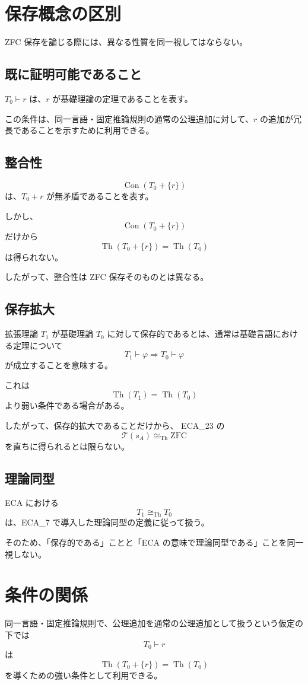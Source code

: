 \documentclass[a4paper,11pt]{article}
\begin{document}
\section{保存概念の区別}
ZFC 保存を論じる際には、異なる性質を同一視してはならない。

\subsection{既に証明可能であること}
$T_0\vdash r$ は、$r$ が基礎理論の定理であることを表す。

この条件は、同一言語・固定推論規則の通常の公理追加に対して、$r$ の追加が冗長であることを示すために利用できる。

\subsection{整合性}

\[
\operatorname{Con}(T_0+\{r\})
\]
は、$T_0+r$ が無矛盾であることを表す。

しかし、
\[
\operatorname{Con}(T_0+\{r\})
\]
だけから
\[
\operatorname{Th}(T_0+\{r\})
=
\operatorname{Th}(T_0)
\]
は得られない。

したがって、整合性は ZFC 保存そのものとは異なる。

\subsection{保存拡大}
拡張理論 $T_1$ が基礎理論 $T_0$ に対して保存的であるとは、通常は基礎言語における定理について
\[
T_1\vdash\varphi
\Longrightarrow
T_0\vdash\varphi
\]
が成立することを意味する。

これは
\[
\operatorname{Th}(T_1)=\operatorname{Th}(T_0)
\]
より弱い条件である場合がある。

したがって、保存的拡大であることだけから、
ECA_23 の
\[
\mathcal{T}(s_A)\cong_{\mathrm{Th}}\mathrm{ZFC}
\]
を直ちに得られるとは限らない。

\subsection{理論同型}
ECA における
\[
T_1\cong_{\mathrm{Th}}T_0
\]
は、ECA_7 で導入した理論同型の定義に従って扱う。

そのため、「保存的である」ことと「ECA の意味で理論同型である」ことを同一視しない。

\section{条件の関係}
同一言語・固定推論規則で、公理追加を通常の公理追加として扱うという仮定の下では
\[
T_0\vdash r
\]
は
\[
\operatorname{Th}(T_0+\{r\}) = \operatorname{Th}(T_0)
\]
を導くための強い条件として利用できる。
\end{document}
